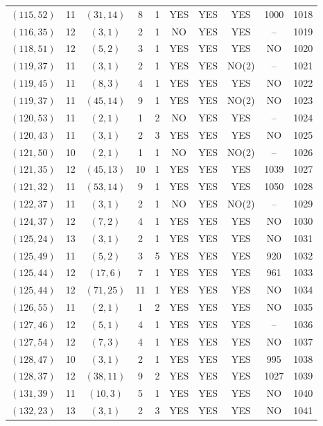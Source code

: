 \begin{longtable}{|c|c|c|c|c|c|c|c|c|c|}
$(115, 52)$ & 11 & $(31, 14)$ & 8 & 1 & YES & YES & YES & 1000 & 1018\\
$(116, 35)$ & 12 & $(3, 1)$ & 2 & 1 & NO & YES & YES & -- & 1019\\
$(118, 51)$ & 12 & $(5, 2)$ & 3 & 1 & YES & YES & YES & NO & 1020\\
$(119, 37)$ & 11 & $(3, 1)$ & 2 & 1 & YES & YES & NO(2) & -- & 1021\\
$(119, 45)$ & 11 & $(8, 3)$ & 4 & 1 & YES & YES & YES & NO & 1022\\
$(119, 37)$ & 11 & $(45, 14)$ & 9 & 1 & YES & YES & NO(2) & NO & 1023\\
$(120, 53)$ & 11 & $(2, 1)$ & 1 & 2 & NO & YES & YES & -- & 1024\\
$(120, 43)$ & 11 & $(3, 1)$ & 2 & 3 & YES & YES & YES & NO & 1025\\
$(121, 50)$ & 10 & $(2, 1)$ & 1 & 1 & NO & YES & NO(2) & -- & 1026\\
$(121, 35)$ & 12 & $(45, 13)$ & 10 & 1 & YES & YES & YES & 1039 & 1027\\
$(121, 32)$ & 11 & $(53, 14)$ & 9 & 1 & YES & YES & YES & 1050 & 1028\\
$(122, 37)$ & 11 & $(3, 1)$ & 2 & 1 & NO & YES & NO(2) & -- & 1029\\
$(124, 37)$ & 12 & $(7, 2)$ & 4 & 1 & YES & YES & YES & NO & 1030\\
$(125, 24)$ & 13 & $(3, 1)$ & 2 & 1 & YES & YES & YES & NO & 1031\\
$(125, 49)$ & 11 & $(5, 2)$ & 3 & 5 & YES & YES & YES & 920 & 1032\\
$(125, 44)$ & 12 & $(17, 6)$ & 7 & 1 & YES & YES & YES & 961 & 1033\\
$(125, 44)$ & 12 & $(71, 25)$ & 11 & 1 & YES & YES & YES & NO & 1034\\
$(126, 55)$ & 11 & $(2, 1)$ & 1 & 2 & YES & YES & YES & NO & 1035\\
$(127, 46)$ & 12 & $(5, 1)$ & 4 & 1 & YES & YES & YES & -- & 1036\\
$(127, 54)$ & 12 & $(7, 3)$ & 4 & 1 & YES & YES & YES & NO & 1037\\
$(128, 47)$ & 10 & $(3, 1)$ & 2 & 1 & YES & YES & YES & 995 & 1038\\
$(128, 37)$ & 12 & $(38, 11)$ & 9 & 2 & YES & YES & YES & 1027 & 1039\\
$(131, 39)$ & 11 & $(10, 3)$ & 5 & 1 & YES & YES & YES & NO & 1040\\
$(132, 23)$ & 13 & $(3, 1)$ & 2 & 3 & YES & YES & YES & NO & 1041\\

\end{longtable}
